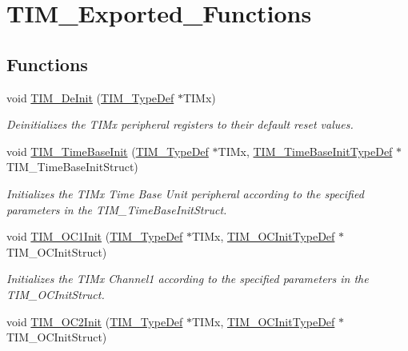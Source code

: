 \hypertarget{group___t_i_m___exported___functions}{}\section{T\+I\+M\+\_\+\+Exported\+\_\+\+Functions}
\label{group___t_i_m___exported___functions}
\subsection*{Functions}
\begin{DoxyCompactItemize}
\item 
void \mbox{\hyperlink{group___t_i_m___exported___functions_ga1659cc0ce503ac151568e0c7c02b1ba5}{T\+I\+M\+\_\+\+De\+Init}} (\mbox{\hyperlink{struct_t_i_m___type_def}{T\+I\+M\+\_\+\+Type\+Def}} $\ast$T\+I\+Mx)
\begin{DoxyCompactList}\small\item\em Deinitializes the T\+I\+Mx peripheral registers to their default reset values. \end{DoxyCompactList}\item 
void \mbox{\hyperlink{group___t_i_m___exported___functions_ga83fd58c9416802d9638bbe1715c98932}{T\+I\+M\+\_\+\+Time\+Base\+Init}} (\mbox{\hyperlink{struct_t_i_m___type_def}{T\+I\+M\+\_\+\+Type\+Def}} $\ast$T\+I\+Mx, \mbox{\hyperlink{struct_t_i_m___time_base_init_type_def}{T\+I\+M\+\_\+\+Time\+Base\+Init\+Type\+Def}} $\ast$T\+I\+M\+\_\+\+Time\+Base\+Init\+Struct)
\begin{DoxyCompactList}\small\item\em Initializes the T\+I\+Mx Time Base Unit peripheral according to the specified parameters in the T\+I\+M\+\_\+\+Time\+Base\+Init\+Struct. \end{DoxyCompactList}\item 
void \mbox{\hyperlink{group___t_i_m___exported___functions_gafcdb6ff00158862aef7fed5e7a554a3e}{T\+I\+M\+\_\+\+O\+C1\+Init}} (\mbox{\hyperlink{struct_t_i_m___type_def}{T\+I\+M\+\_\+\+Type\+Def}} $\ast$T\+I\+Mx, \mbox{\hyperlink{struct_t_i_m___o_c_init_type_def}{T\+I\+M\+\_\+\+O\+C\+Init\+Type\+Def}} $\ast$T\+I\+M\+\_\+\+O\+C\+Init\+Struct)
\begin{DoxyCompactList}\small\item\em Initializes the T\+I\+Mx Channel1 according to the specified parameters in the T\+I\+M\+\_\+\+O\+C\+Init\+Struct. \end{DoxyCompactList}\item 
void \mbox{\hyperlink{group___t_i_m___exported___functions_ga2017455121d910d6ff63ac6f219842c5}{T\+I\+M\+\_\+\+O\+C2\+Init}} (\mbox{\hyperlink{struct_t_i_m___type_def}{T\+I\+M\+\_\+\+Type\+Def}} $\ast$T\+I\+Mx, \mbox{\hyperlink{struct_t_i_m___o_c_init_type_def}{T\+I\+M\+\_\+\+O\+C\+Init\+Type\+Def}} $\ast$T\+I\+M\+\_\+\+O\+C\+Init\+Struct)

\end{DoxyCompactItemize}
